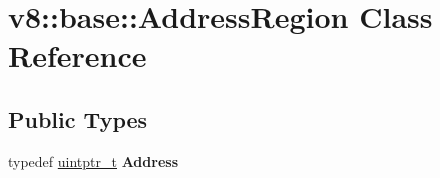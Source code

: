 \hypertarget{classv8_1_1base_1_1AddressRegion}{}\section{v8\+:\+:base\+:\+:Address\+Region Class Reference}
\label{classv8_1_1base_1_1AddressRegion}
\subsection*{Public Types}
\begin{DoxyCompactItemize}
\item 
\mbox{\label{classv8_1_1base_1_1AddressRegion_a553c65b61da09870ca7b71415c9cd4b9}} 
typedef \mbox{\hyperlink{classuintptr__t}{uintptr\+\_\+t}} {\bfseries Address}
\end{DoxyCompactItemize}
